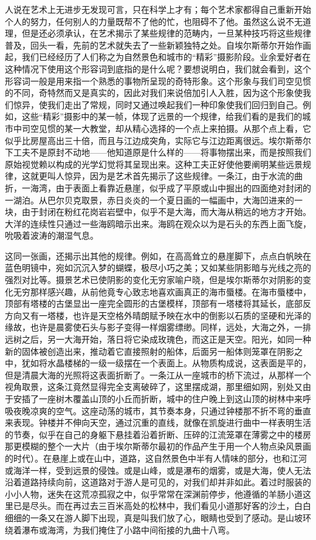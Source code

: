 \par 人说在艺术上无进步无发现可言，只在科学上才有；每个艺术家都得自己重新开始个人的努力，任何别人的力量既帮不了他的忙，也阻碍不了他。虽然这么说不无道理，但是还必须承认，在艺术揭示了某些规律的范畴内，一旦某种技巧将这些规律普及，回头一看，先前的艺术就失去了一些新颖独特之处。自埃尔斯蒂尔开始作画起，我们已经经历了人们称之为自然景色和城市的“精彩”摄影阶段。业余爱好者在这种情况下使用这个形容词到底指的是什么呢？要想说明白，我们就会看到，这个形容词一般是用来指一个熟悉的事物所呈现的奇特形象。这个形象与我们司空见惯的不同，奇特然而又是真实的，因此对我们来说倍加引人入胜，因为这个形象使我们惊异，使我们走出了常规，同时又通过唤起我们一种印象使我们回归到自己。例如，这些“精彩”摄影中的某一帧，体现了远景的一个规律，给我们看的是我们的城市中司空见惯的某一大教堂，却从精心选择的一个点上来拍摄。从那个点上看，它似乎比房屋高出三十倍，而且与江边成突角，实际它与江边距离很远。埃尔斯蒂尔下工夫不是原封不动地——他知道原是什么样的——将事物摆出来，而是按照我们原始视觉赖以构成的光学幻觉将其呈现出来。这种工夫正好使他要阐明某些远景规律，这就更叫人惊异，因为是艺术首先揭示了这些规律。一条江，由于水流的曲折，一海湾，由于表面上看靠近悬崖，似乎成了平原或山中掘出的四面绝对封闭的一湖泊。从巴尔贝克取景，赤日炎炎的一个夏日画的一幅画中，大海凹进来的一块，由于封闭在粉红花岗岩岩壁中，似乎不是大海，而大海从稍远的地方才开始。大洋的连续性只通过一些海鸥暗示出来。海鸥在观众以为是石头的东西上面飞旋，吮吸着波涛的潮湿气息。
\par 这同一张画，还揭示出其他的规律。例如，在高高耸立的悬崖脚下，点点白帆映在蓝色明镜中，宛如沉沉入梦的蝴蝶，极尽小巧之美；又如某些阴影暗与光线之亮的强烈对比等。摄景艺术已使阴影的变化无穷家喻户晓，但是埃尔斯蒂尔对阴影的变化无穷那样感兴趣，从前他竟专心致志地喜欢画真正的海市蜃楼。在海市蜃楼中，顶部有塔楼的古堡显出一座完全圆形的古堡模样，顶部有一塔楼将其延长，底部反方向又有一塔楼，也许是天空格外晴朗赋予映在水中的倒影以石质的坚硬和光泽的缘故，也许是晨雾使石头与影子变得一样烟雾缥缈。同样，远处，大海之外，一排远树之后，另一大海开始，落日将它染成玫瑰色，而这正是天空。阳光，如同一种新的固体被创造出来，推动着它直接照射的船体，后面另一船体则笼罩在阴影之中，犹如将水晶楼梯的一级一级摆在一个表面上。从物质构成说，这表面是平的，但是清晨大海的光照将这表面折断了。一条江从一座城市的桥下流过，从那样一个视角取景，这条江竟然显得完全支离破碎了，这里摆成湖，那里细如网，别处又由于安插了一座树木覆盖山顶的小丘而折断，城中的住户晚上到这山顶的树林中来呼吸夜晚凉爽的空气。这座动荡的城市，其节奏本身，只通过钟楼那不折不弯的垂直来表现。钟楼并不伸向天空，通过沉重的直线，就像在凯旋进行曲中一样表明生活的节奏，似乎在自己的身躯下悬挂着沿着折断、压碎的江流笼罩在薄雾之中的楼房那更模糊的整个一大片（由于埃尔斯蒂尔最初的作品产生于用一个人物点染风景画的时代）。在悬崖上或在山中，道路，这自然景色中半有人情味的部分，也和江河或海洋一样，受到远景的侵蚀。或是山峰，或是瀑布的烟雾，或是大海，使人无法沿着道路持续向前，这道路对于游人是可见的，对我们却并非如此。着过时服装的小小人物，迷失在这荒凉孤寂之中，似乎常常在深渊前停步，他遵循的羊肠小道这里已是尽头。而在再过去三百米高处的松林中，我们看见小道那好客的沙土，白白细细的一条又在游人脚下出现，真是叫我们放了心，眼睛也受到了感动。是山坡环绕着瀑布或海湾，为我们掩住了小路中间衔接的九曲十八弯。

